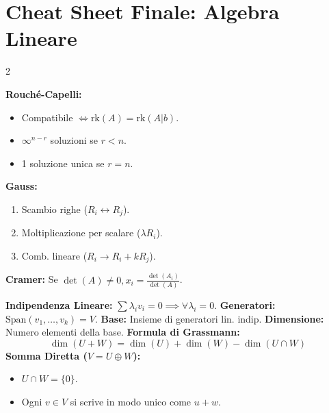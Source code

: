 \newpage
{} %
\section*{Cheat Sheet Finale: Algebra Lineare}

\begin{multicols*}{2}

\begin{tcolorbox}[colback=lightBg, colframe=cherryRed, title={Sistemi Lineari ($Ax=b$)}]
\small
\textbf{Rouché-Capelli:}
\begin{itemize}[leftmargin=*]
    \item Compatibile $\iff \text{rk}(A) = \text{rk}(A|b)$.
    \item $\infty^{n-r}$ soluzioni se $r < n$.
    \item 1 soluzione unica se $r = n$.
\end{itemize}
\textbf{Gauss:}
\begin{enumerate}[leftmargin=*]
    \item Scambio righe ($R_i \leftrightarrow R_j$).
    \item Moltiplicazione per scalare ($\lambda R_i$).
    \item Comb. lineare ($R_i \to R_i + k R_j$).
\end{enumerate}
\textbf{Cramer:} Se $\det(A) \neq 0, x_i = \frac{\det(A_i)}{\det(A)}$.
\end{tcolorbox}

\begin{tcolorbox}[colback=white, colframe=maroon, title={Spazi Vettoriali e Basi}]
\small
\textbf{Indipendenza Lineare:} $\sum \lambda_i v_i = 0 \implies \forall \lambda_i = 0$.
\textbf{Generatori:} $\text{Span}(v_1, \dots, v_k) = V$.
\textbf{Base:} Insieme di generatori lin. indip.
\textbf{Dimensione:} Numero elementi della base.
\tcblower
\textbf{Formula di Grassmann:}
\[ \dim(U+W) = \dim(U) + \dim(W) - \dim(U \cap W) \]
\textbf{Somma Diretta ($V = U \oplus W$):}
\begin{itemize}[leftmargin=*]
    \item $U \cap W = \{0\}$.
    \item Ogni $v \in V$ si scrive in modo unico come $u+w$.
\end{itemize}
\end{tcolorbox}


\end{multicols*}
